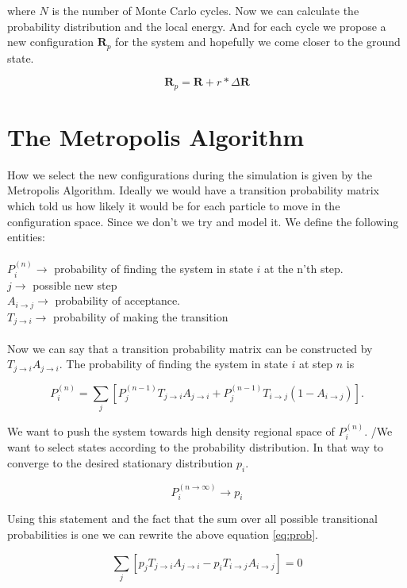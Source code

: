 where $N$ is the number of Monte Carlo cycles. Now we can calculate the probability distribution and the local energy. And for each cycle we propose a new configuration $\mathbf{R}_p$ for the system and hopefully we come closer to the ground state.

$$\mathbf{R}_p = \mathbf{R} + r \ast \Delta \mathbf{R}$$

\section{The Metropolis Algorithm}

How we select the new configurations during the simulation is given by the Metropolis Algorithm. 
Ideally we would have a transition probability matrix which told us how likely it would be for each particle to move in the configuration space. Since we don't we try and model it.
We define the following entities:
\\
\\
$P_i^{(n)} \rightarrow$ probability of finding the system in state $i$ at the n'th step.
\\
$j \rightarrow$ possible new step
\\
$A_{i \rightarrow j} \rightarrow$ probability of acceptance. 
\\
$T_{j \rightarrow i} \rightarrow$ probability of making the transition  
\\
\\
Now we can say that a transition probability matrix can be constructed by $T_{j \rightarrow i}A_{j \rightarrow i}.$ The probability of finding the system in state $i$ at step $n$ is

\begin{equation}\label{eq:prob}
P_i^{(n)} = \sum_j \left[P_j^{(n-1)} T_{j \rightarrow i}A_{j \rightarrow i} + P_j^{(n-1)}T_{i \rightarrow j}(1 - A_{i \rightarrow j})\right].
\end{equation}

We want to push the system towards high density regional space of $P_i^{(n)}$. /We want to select states according to the probability distribution. In that way to converge to the desired stationary distribution $p_i$.

$$P_i^{(n \rightarrow \infty)} \rightarrow p_i$$

Using this statement and the fact that the sum over all possible transitional probabilities is one we can rewrite the above equation \ref{eq:prob}.

$$\sum_j [p_j T_{j \rightarrow i}A_{j \rightarrow i} - p_i T_{i \rightarrow j}A_{i \rightarrow j}] = 0$$

